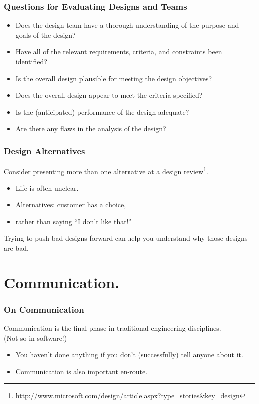 \begin{frame}
\frametitle{Questions for Evaluating Designs and Teams}
\begin{changemargin}{2em}
\begin{itemize}
\item Does the design team have a thorough understanding of the purpose and goals of the design?
\item Have all of the relevant requirements, criteria, and constraints been identified?
\item Is the overall design plausible for meeting the design objectives?
\item Does the overall design appear to meet the criteria specified?
\item Is the (anticipated) performance of the design adequate?
\item Are there any flaws in the analysis of the design?
\end{itemize}
\end{changemargin}

\end{frame}

\begin{frame}
\frametitle{Design Alternatives}

\begin{changemargin}{2em}
Consider presenting more than one alternative
at a design
review\footnote{\url{http://www.microsoft.com/design/article.aspx?type=stories&key=design}}. 

\begin{itemize}
\item Life is often unclear.
\item Alternatives: customer has a choice,
\item rather than saying ``I don't like that!''
\end{itemize}

Trying to push bad designs forward can help you understand why those
designs are bad.
\end{changemargin}

\end{frame}

\section{Communication.} 

\begin{frame}
\frametitle{On Communication}

\begin{changemargin}{2em}
Communication is the final phase in traditional engineering
disciplines.\\[1em]

(Not so in software!)

\begin{itemize}
\item You
haven't done anything if you don't (successfully) tell anyone about
it. 
\item Communication is also important en-route.
\end{itemize}
\end{changemargin}

\end{frame}

